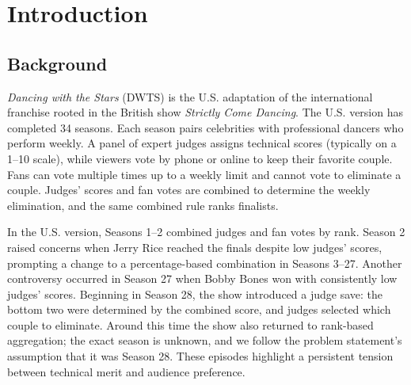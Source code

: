 \section{Introduction}
\subsection{Background}
\textit{Dancing with the Stars} (DWTS) is the U.S. adaptation of the international franchise rooted in the British show \textit{Strictly Come Dancing}. The U.S. version has completed 34 seasons. Each season pairs celebrities with professional dancers who perform weekly. A panel of expert judges assigns technical scores (typically on a 1--10 scale), while viewers vote by phone or online to keep their favorite couple. Fans can vote multiple times up to a weekly limit and cannot vote to eliminate a couple. Judges' scores and fan votes are combined to determine the weekly elimination, and the same combined rule ranks finalists.

In the U.S. version, Seasons 1--2 combined judges and fan votes by rank. Season 2 raised concerns when Jerry Rice reached the finals despite low judges' scores, prompting a change to a percentage-based combination in Seasons 3--27. Another controversy occurred in Season 27 when Bobby Bones won with consistently low judges' scores. Beginning in Season 28, the show introduced a judge save: the bottom two were determined by the combined score, and judges selected which couple to eliminate. Around this time the show also returned to rank-based aggregation; the exact season is unknown, and we follow the problem statement's assumption that it was Season 28. These episodes highlight a persistent tension between technical merit and audience preference.

